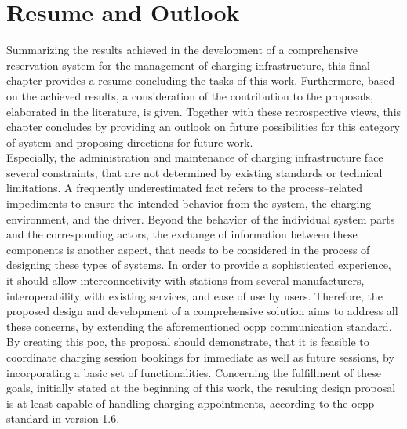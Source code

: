

\chapter{Resume and Outlook}
\label{ch:Resume and Outlook}

Summarizing the results achieved in the development of a comprehensive reservation system for the management of charging infrastructure, this final chapter provides a resume concluding the tasks of this work. 
Furthermore, based on the achieved results, a consideration of the contribution to the proposals, elaborated in the literature, is given. 
Together with these retrospective views, this chapter concludes by providing an outlook on future possibilities for this category of system and proposing directions for future work. \\
\noindent Especially, the administration and maintenance of charging infrastructure face several constraints, that are not determined by existing standards or technical limitations.
A frequently underestimated fact refers to the process--related impediments to ensure the intended behavior from the system, the charging environment, and the driver.
Beyond the behavior of the individual system parts and the corresponding actors, the exchange of information between these components is another aspect, that needs to be considered in the process of designing these types of systems. 
In order to provide a sophisticated experience, it should allow interconnectivity with stations from several manufacturers, interoperability with existing services, and ease of use by users.
Therefore, the proposed design and development of a comprehensive solution aims to address all these concerns, by extending the aforementioned \acrshort{ocpp} communication standard.
By creating this \acrshort{poc}, the proposal should demonstrate, that it is feasible to coordinate charging session bookings for immediate as well as future sessions, by incorporating a basic set of functionalities.
Concerning the fulfillment of these goals, initially stated at the beginning of this work, the resulting design proposal is at least capable of handling charging appointments, according to the \acrshort{ocpp} standard in version 1.6. 
